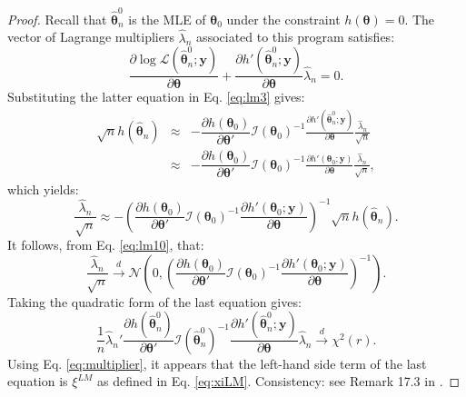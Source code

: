 \documentclass[
  12pt,
]{book}
\theoremstyle{definition}
\theoremstyle{definition}
\theoremstyle{definition}
\theoremstyle{definition}
\theoremstyle{remark}
\begin{document}
\begin{proof}
Recall that \(\hat{\boldsymbol\theta}^0_n\) is the MLE of \(\boldsymbol\theta_0\) under the constraint \(h(\boldsymbol\theta)=0\). The vector of Lagrange multipliers \(\hat\lambda_n\) associated to this program satisfies:
\begin{equation}
\frac{\partial \log \mathcal{L}(\hat{\boldsymbol\theta}^0_n;\mathbf{y})}{\partial \boldsymbol\theta}+ \frac{\partial h'(\hat{\boldsymbol\theta}^0_n;\mathbf{y})}{\partial \boldsymbol\theta}\hat\lambda_n = 0.\label{eq:multiplier}
\end{equation}
Substituting the latter equation in Eq. \eqref{eq:lm3} gives:
\begin{eqnarray*}
\sqrt{n}h(\hat{\boldsymbol\theta}_n) &\approx&
- \dfrac{\partial h(\boldsymbol\theta_0)}{\partial \boldsymbol\theta'} \mathcal{I}(\boldsymbol\theta_0)^{-1}
\frac{\partial h'(\hat{\boldsymbol\theta}^0_n;\mathbf{y})}{\partial \boldsymbol\theta} \frac{\hat\lambda_n}{\sqrt{n}} \\
&\approx&
- \dfrac{\partial h(\boldsymbol\theta_0)}{\partial \boldsymbol\theta'} \mathcal{I}(\boldsymbol\theta_0)^{-1}
\frac{\partial h'(\boldsymbol\theta_0;\mathbf{y})}{\partial \boldsymbol\theta} \frac{\hat\lambda_n}{\sqrt{n}},
\end{eqnarray*}
which yields:
\begin{equation}
\frac{\hat\lambda_n}{\sqrt{n}} \approx - \left(
\dfrac{\partial h(\boldsymbol\theta_0)}{\partial \boldsymbol\theta'} \mathcal{I}(\boldsymbol\theta_0)^{-1}
\frac{\partial h'(\boldsymbol\theta_0;\mathbf{y})}{\partial \boldsymbol\theta}
\right)^{-1}
\sqrt{n}h(\hat{\boldsymbol\theta}_n).\label{eq:lm20}
\end{equation}
It follows, from Eq. \eqref{eq:lm10}, that:
\[
\frac{\hat\lambda_n}{\sqrt{n}} \overset{d}{\rightarrow} \mathcal{N}\left(0,\left(
\dfrac{\partial h(\boldsymbol\theta_0)}{\partial \boldsymbol\theta'} \mathcal{I}(\boldsymbol\theta_0)^{-1}
\frac{\partial h'(\boldsymbol\theta_0;\mathbf{y})}{\partial \boldsymbol\theta}
\right)^{-1}\right).
\]
Taking the quadratic form of the last equation gives:
\[
\frac{1}{n}\hat\lambda_n' \dfrac{\partial h(\hat{\boldsymbol\theta}^0_n)}{\partial \boldsymbol\theta'} \mathcal{I}(\hat{\boldsymbol\theta}^0_n)^{-1}
\frac{\partial h'(\hat{\boldsymbol\theta}^0_n;\mathbf{y})}{\partial \boldsymbol\theta} \hat\lambda_n \overset{d}{\rightarrow} \chi^2(r).
\]
Using Eq. \eqref{eq:multiplier}, it appears that the left-hand side term of the last equation is \(\xi^{LM}\) as defined in Eq. \eqref{eq:xiLM}. Consistency: see Remark 17.3 in \citet{gourieroux_monfort_1995}.
\end{proof}
\end{document}
